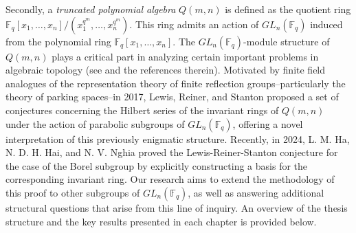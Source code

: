 \documentclass[12pt,a4paper]{report}
\theoremstyle{definition}
\theoremstyle{remark}
\theoremstyle{definition}
\begin{document}
Secondly, a \emph{truncated polynomial algebra} $Q(m, n)$ is defined as the quotient ring $\mathbb{F}_q[x_1, \ldots, x_n]/(x_1^{q^m}, \ldots, x_n^{q^m})$. This ring admits an action of $GL_n(\mathbb{F}_q)$ induced from the polynomial ring $\mathbb{F}_q[x_1, \ldots, x_n]$. The $GL_n(\mathbb{F}_q)$-module structure of $Q(m, n)$ plays a critical part in analyzing certain important problems in algebraic topology (see \cite[Section 1]{Ha_Hai_Nghia_2024} and the references therein). Motivated by finite field analogues of the representation theory of finite reflection groups--particularly the theory of parking spaces--in 2017, Lewis, Reiner, and Stanton \cite{Lewis_Reiner_Stanton_2017} proposed a set of conjectures concerning the Hilbert series of the invariant rings of $Q(m, n)$ under the action of parabolic subgroups of $GL_n(\mathbb{F}_q)$, offering a novel interpretation of this previously enigmatic structure. Recently, in 2024, L. M. Ha, N. D. H. Hai, and N. V. Nghia \cite{Ha_Hai_Nghia_2024} proved the Lewis-Reiner-Stanton conjecture for the case of the Borel subgroup by explicitly constructing a basis for the corresponding invariant ring. Our research aims to extend the methodology of this proof to other subgroups of $GL_n(\mathbb{F}_q)$, as well as answering additional structural questions that arise from this line of inquiry.\smallbreak
An overview of the thesis structure and the key results presented in each chapter is provided below.
\end{document}
